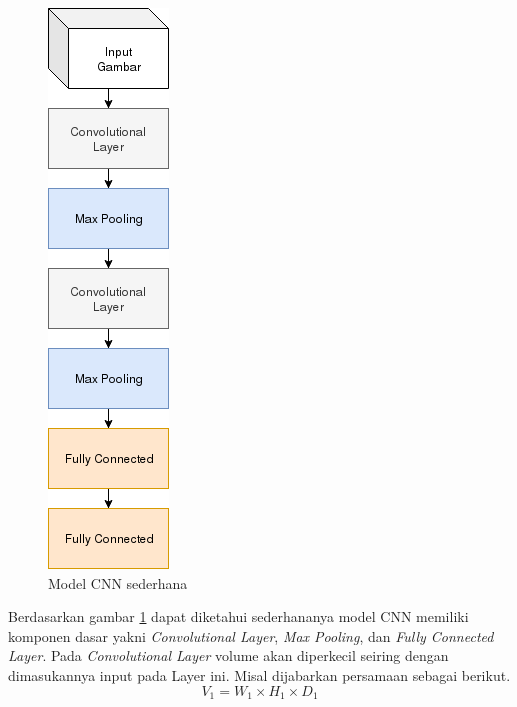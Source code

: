 \documentclass[./skripsi.tex]{subfiles}
\begin{document}
\begin{figure}%
    \centering
    \includegraphics[width=0.35\linewidth]{public/assets/img/SimpleCNN.png}
    \caption{Model CNN sederhana}
    \label{fig:modelcnnsederhana}
\end{figure}
\par Berdasarkan gambar \ref{fig:modelcnnsederhana} dapat diketahui sederhananya model CNN memiliki komponen dasar yakni \textit{Convolutional Layer}, \textit{Max Pooling}, dan \textit{Fully Connected Layer}. Pada \textit{Convolutional Layer} volume akan diperkecil seiring dengan dimasukannya input pada Layer ini. Misal dijabarkan persamaan sebagai berikut.
\begin{equation}
    V_1 = W_1 \times H_1 \times D_1
    \label{eq:volcnn}
\end{equation}
\end{document}
